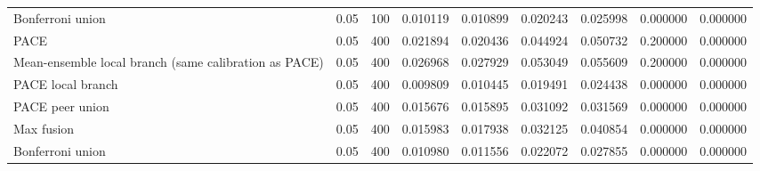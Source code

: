 \begin{tabular}{lllllllll}
Bonferroni union & 0.05 & 100 & 0.010119 & 0.010899 & 0.020243 & 0.025998 & 0.000000 & 0.000000 \\
PACE & 0.05 & 400 & 0.021894 & 0.020436 & 0.044924 & 0.050732 & 0.200000 & 0.000000 \\
Mean-ensemble local branch (same calibration as PACE) & 0.05 & 400 & 0.026968 & 0.027929 & 0.053049 & 0.055609 & 0.200000 & 0.000000 \\
PACE local branch & 0.05 & 400 & 0.009809 & 0.010445 & 0.019491 & 0.024438 & 0.000000 & 0.000000 \\
PACE peer union & 0.05 & 400 & 0.015676 & 0.015895 & 0.031092 & 0.031569 & 0.000000 & 0.000000 \\
Max fusion & 0.05 & 400 & 0.015983 & 0.017938 & 0.032125 & 0.040854 & 0.000000 & 0.000000 \\
Bonferroni union & 0.05 & 400 & 0.010980 & 0.011556 & 0.022072 & 0.027855 & 0.000000 & 0.000000 \\
\bottomrule
\end{tabular}
